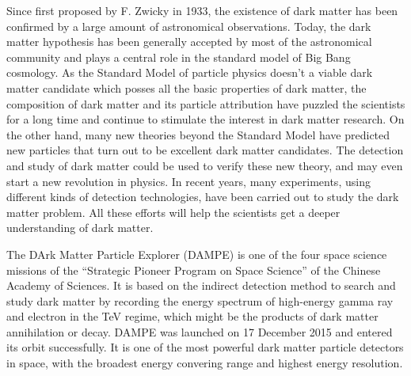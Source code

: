 \begin{eabstract}
Since first proposed by F. Zwicky in 1933, the existence of dark matter has been confirmed by a large amount of astronomical observations.
Today, the dark matter hypothesis has been generally accepted by most of the astronomical community and plays a central role in the standard model of Big Bang cosmology.
As the Standard Model of particle physics doesn't a viable dark matter candidate which posses all the basic properties of dark matter, the composition of dark matter and its particle attribution have puzzled the scientists for a long time and continue to stimulate the interest in dark matter research.
On the other hand, many new theories beyond the Standard Model have predicted new particles that turn out to be excellent dark matter candidates.
The detection and study of dark matter could be used to verify these new theory, and may even start a new revolution in physics.
In recent years, many experiments, using different kinds of detection technologies, have been carried out to study the dark matter problem.
All these efforts will help the scientists get a deeper understanding of dark matter.

The DArk Matter Particle Explorer (DAMPE) is one of the four space science missions of the “Strategic Pioneer Program on Space Science” of the Chinese Academy of Sciences. It is based on the indirect detection method to search and study dark matter by recording the energy spectrum of high-energy gamma ray and electron in the TeV regime, which might be the products of dark matter annihilation or decay.
DAMPE was launched on 17 December 2015 and entered its orbit successfully.
It is one of the most powerful dark matter particle detectors in space, with the broadest energy convering range and highest energy resolution.


\end{eabstract}
